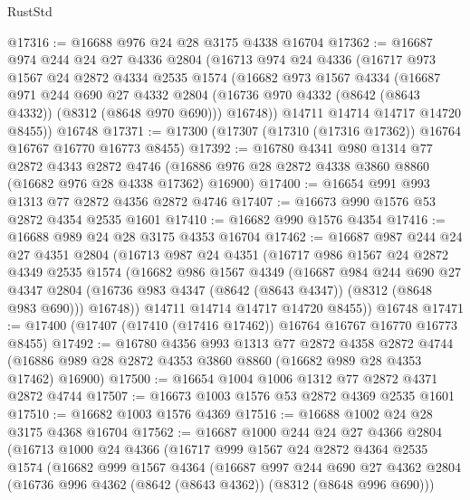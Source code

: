 \begin{lexlean}{RustStd}
\begin{coremodule}
@17316 := @16688 @976 @24 @28 @3175 @4338 @16704
@17362 := @16687
    @974
    @244
    @24
    @27
    @4336
    @2804
    (@16713
      @974
      @24
      @4336
      (@16717
        @973
        @1567
        @24
        @2872
        @4334
        @2535
        @1574
        (@16682
          @973
          @1567
          @4334
          (@16687
            @971
            @244
            @690
            @27
            @4332
            @2804
            (@16736 @970 @4332 (@8642 (@8643 @4332)) (@8312 (@8648 @970 @690)))
            @16748))
        @14711
        @14714
        @14717
        @14720
        @8455))
    @16748
@17371 := @17300 (@17307 (@17310 (@17316 @17362)) @16764 @16767 @16770 @16773 @8455)
@17392 := @16780
    @4341
    @980
    @1314
    @77
    @2872
    @4343
    @2872
    @4746
    (@16886 @976 @28 @2872 @4338 @3860 @8860 (@16682 @976 @28 @4338 @17362) @16900)
@17400 := @16654 @991 @993 @1313 @77 @2872 @4356 @2872 @4746
@17407 := @16673 @990 @1576 @53 @2872 @4354 @2535 @1601
@17410 := @16682 @990 @1576 @4354
@17416 := @16688 @989 @24 @28 @3175 @4353 @16704
@17462 := @16687
    @987
    @244
    @24
    @27
    @4351
    @2804
    (@16713
      @987
      @24
      @4351
      (@16717
        @986
        @1567
        @24
        @2872
        @4349
        @2535
        @1574
        (@16682
          @986
          @1567
          @4349
          (@16687
            @984
            @244
            @690
            @27
            @4347
            @2804
            (@16736 @983 @4347 (@8642 (@8643 @4347)) (@8312 (@8648 @983 @690)))
            @16748))
        @14711
        @14714
        @14717
        @14720
        @8455))
    @16748
@17471 := @17400 (@17407 (@17410 (@17416 @17462)) @16764 @16767 @16770 @16773 @8455)
@17492 := @16780
    @4356
    @993
    @1313
    @77
    @2872
    @4358
    @2872
    @4744
    (@16886 @989 @28 @2872 @4353 @3860 @8860 (@16682 @989 @28 @4353 @17462) @16900)
@17500 := @16654 @1004 @1006 @1312 @77 @2872 @4371 @2872 @4744
@17507 := @16673 @1003 @1576 @53 @2872 @4369 @2535 @1601
@17510 := @16682 @1003 @1576 @4369
@17516 := @16688 @1002 @24 @28 @3175 @4368 @16704
@17562 := @16687
    @1000
    @244
    @24
    @27
    @4366
    @2804
    (@16713
      @1000
      @24
      @4366
      (@16717
        @999
        @1567
        @24
        @2872
        @4364
        @2535
        @1574
        (@16682
          @999
          @1567
          @4364
          (@16687
            @997
            @244
            @690
            @27
            @4362
            @2804
            (@16736 @996 @4362 (@8642 (@8643 @4362)) (@8312 (@8648 @996 @690)))

\end{coremodule}
\end{lexlean}
